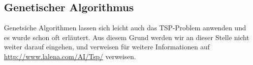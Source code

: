 \subsection{Genetischer Algorithmus}

Genetsiche Algorithmen lassen sich leicht auch das TSP-Problem anwenden und es wurde schon oft erläutert. Aus diesem Grund werden wir an dieser Stelle nicht weiter darauf eingehen, und verweisen für weitere Informationen auf \url{http://www.lalena.com/AI/Tsp/} verweisen. 
